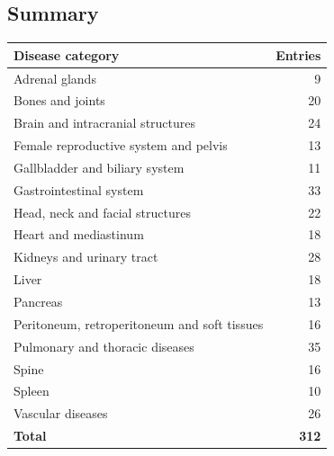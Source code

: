 \subsection{Summary}
\begin{center}
\begin{tabular}{@{}p{}r@{}}
\toprule
\textbf{Disease category} & \textbf{Entries} \\
\midrule
Adrenal glands & 9 \\
Bones and joints & 20 \\
Brain and intracranial structures & 24 \\
Female reproductive system and pelvis & 13 \\
Gallbladder and biliary system & 11 \\
Gastrointestinal system & 33 \\
Head, neck and facial structures & 22 \\
Heart and mediastinum & 18 \\
Kidneys and urinary tract & 28 \\
Liver & 18 \\
Pancreas & 13 \\
Peritoneum, retroperitoneum and soft tissues & 16 \\
Pulmonary and thoracic diseases & 35 \\
Spine & 16 \\
Spleen & 10 \\
Vascular diseases & 26 \\
\midrule
\textbf{Total} & \textbf{312} \\
\bottomrule
\end{tabular}
\end{center}

